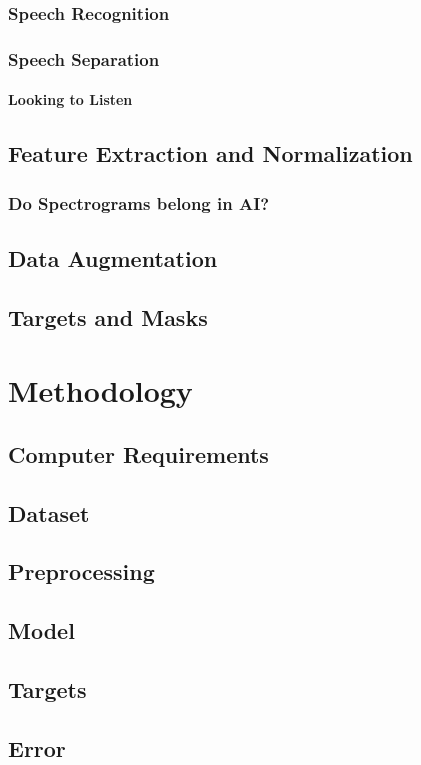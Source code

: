 \documentclass{book}
\begin{document}
    \subsection{Speech Recognition}
    \subsection{Speech Separation}
      \subsubsection{Looking to Listen}
  \section{Feature Extraction and Normalization}
    \subsection{Do Spectrograms belong in AI?}
  \section{Data Augmentation}
  \section{Targets and Masks}

\chapter{Methodology}
  \section{Computer Requirements}
  \section{Dataset}
  \section{Preprocessing}
  \section{Model}
  \section{Targets}
  \section{Error}
\end{document}
